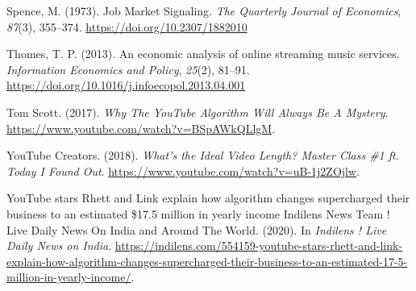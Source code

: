 \documentclass[
]{article}
\newlength{\cslhangindent}
\newlength{\cslentryspacingunit} %
\newenvironment{CSLReferences}[2] %
 {%
  \setlength{\parindent}{0pt}
  \ifodd #1
  \let\oldpar\par
  \def\par{\hangindent=\cslhangindent\oldpar}
  \fi
  \setlength{\parskip}{#2\cslentryspacingunit}
 }%
 {}
\begin{document}
\begin{CSLReferences}{1}{0}
\leavevmode{}%
Spence, M. (1973). Job {Market Signaling}. \emph{The Quarterly Journal
of Economics}, \emph{87}(3), 355--374.
\url{https://doi.org/10.2307/1882010}

\leavevmode{}%
Thomes, T. P. (2013). An economic analysis of online streaming music
services. \emph{Information Economics and Policy}, \emph{25}(2), 81--91.
\url{https://doi.org/10.1016/j.infoecopol.2013.04.001}

\leavevmode{}%
Tom Scott. (2017). \emph{Why {The YouTube Algorithm Will Always Be A
Mystery}}. \url{https://www.youtube.com/watch?v=BSpAWkQLlgM}.

\leavevmode{}%
YouTube Creators. (2018). \emph{What's the {Ideal Video Length}?
\textbar{} {Master Class} \#1 ft. {Today I Found Out}}.
\url{https://www.youtube.com/watch?v=uB-1j2ZOjlw}.

\leavevmode{}%
{YouTube} stars {Rhett} and {Link} explain how algorithm changes
supercharged their business to an estimated \$17.5 million in yearly
income {Indilens News Team} ! {Live Daily News On India} and {Around The
World}. (2020). In \emph{Indilens ! Live Daily News on India}.
\url{https://indilens.com/554159-youtube-stars-rhett-and-link-explain-how-algorithm-changes-supercharged-their-business-to-an-estimated-17-5-million-in-yearly-income/}.

\end{CSLReferences}
\end{document}
